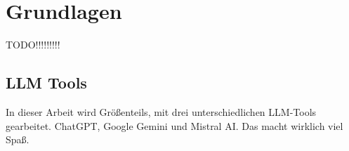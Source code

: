 
\chapter{Grundlagen} 

TODO!!!!!!!!!

\section{LLM Tools}  \label{LLM Tools}

In dieser Arbeit wird Größenteils, mit drei unterschiedlichen LLM-Tools gearbeitet. ChatGPT, Google Gemini und Mistral AI.
Das macht wirklich viel Spaß.